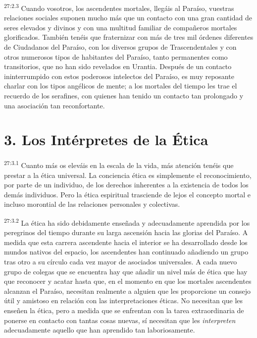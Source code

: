 \par
\textsuperscript{27:2.3} Cuando vosotros, los ascendentes mortales, llegáis al Paraíso, vuestras relaciones sociales suponen mucho más que un contacto con una gran cantidad de seres elevados y divinos y con una multitud familiar de compañeros mortales glorificados. También tenéis que fraternizar con más de tres mil órdenes diferentes de Ciudadanos del Paraíso, con los diversos grupos de Trascendentales y con otros numerosos tipos de habitantes del Paraíso, tanto permanentes como transitorios, que no han sido revelados en Urantia. Después de un contacto ininterrumpido con estos poderosos intelectos del Paraíso, es muy reposante charlar con los tipos angélicos de mente; a los mortales del tiempo les trae el recuerdo de los serafines, con quienes han tenido un contacto tan prolongado y una asociación tan reconfortante.

\section*{3. Los Intérpretes de la Ética}
\par
\textsuperscript{27:3.1} Cuanto más os eleváis en la escala de la vida, más atención tenéis que prestar a la ética universal. La conciencia ética es simplemente el reconocimiento, por parte de un individuo, de los derechos inherentes a la existencia de todos los demás individuos. Pero la ética espiritual trasciende de lejos el concepto mortal e incluso morontial de las relaciones personales y colectivas.

\par
\textsuperscript{27:3.2} La ética ha sido debidamente enseñada y adecuadamente aprendida por los peregrinos del tiempo durante su larga ascensión hacia las glorias del Paraíso. A medida que esta carrera ascendente hacia el interior se ha desarrollado desde los mundos nativos del espacio, los ascendentes han continuado añadiendo un grupo tras otro a su círculo cada vez mayor de asociados universales. A cada nuevo grupo de colegas que se encuentra hay que añadir un nivel más de ética que hay que reconocer y acatar hasta que, en el momento en que los mortales ascendentes alcanzan el Paraíso, necesitan realmente a alguien que les proporcione un consejo útil y amistoso en relación con las interpretaciones éticas. No necesitan que les enseñen la ética, pero a medida que se enfrentan con la tarea extraordinaria de ponerse en contacto con tantas cosas nuevas, sí necesitan que les \textit{interpreten} adecuadamente aquello que han aprendido tan laboriosamente.

